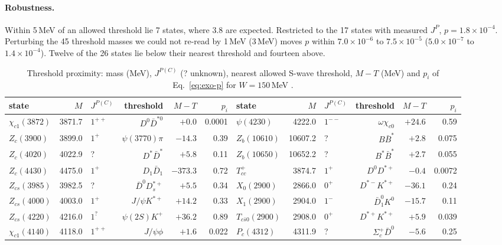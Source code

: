 \paragraph{Robustness.} Within 5\,MeV of an allowed threshold lie 7 states, where 3.8 are expected. Restricted to the 17 states with
measured $J^P$, $p=1.8\times10^{-4}$. Perturbing the 45 threshold masses we could not re-read by 1\,MeV (3\,MeV) moves $p$ within
$7.0\times10^{-6}$ to $7.5\times10^{-5}$ ($5.0\times10^{-7}$ to $1.4\times10^{-4}$). Twelve of the 26 states lie below their nearest
threshold and fourteen above.

\begin{table}[tbp]\centering\scriptsize\setlength{\tabcolsep}{2.6pt}
\caption{Threshold proximity: mass (MeV), $J^{P(C)}$ (? unknown), nearest allowed S-wave threshold, $M-T$ (MeV) and $p_i$ of
Eq.~\eqref{eq:exo-p} for $W=150$\,MeV .}
\label{tab:exo-b}
\begin{tabular}{@{}lrlrrr@{\hspace{8pt}}lrlrrr@{}}
\toprule
state & $M$ & $J^{P(C)}$ & threshold & $M-T$ & $p_i$ & state & $M$ & $J^{P(C)}$ & threshold & $M-T$ & $p_i$ \\
\midrule
$\chi_{c1}(3872)$ & 3871.7 & $1^{++}$ & $D^0\bar D^{*0}$ & $+0.0$ & 0.0001 & $\psi(4230)$ & 4222.0 & $1^{--}$ & $\omega\chi_{c0}$ & $+24.6$ & 0.59 \\
$Z_c(3900)$ & 3899.0 & $1^{+}$ & $\psi(3770)\pi$ & $-14.3$ & 0.39 & $Z_b(10610)$ & 10607.2 & ? & $B\bar B^*$ & $+2.8$ & 0.075 \\
$Z_c(4020)$ & 4022.9 & ? & $D^*\bar D^*$ & $+5.8$ & 0.11 & $Z_b(10650)$ & 10652.2 & ? & $B^*\bar B^*$ & $+2.7$ & 0.055 \\
$Z_c(4430)$ & 4475.0 & $1^{+}$ & $D_1\bar D_1$ & $-373.3$ & 0.72 & $T_{cc}^+$ & 3874.7 & $1^+$ & $D^0D^{*+}$ & $-0.4$ & 0.0072 \\
$Z_{cs}(3985)$ & 3982.5 & ? & $\bar D^0D_s^{*+}$ & $+5.5$ & 0.34 & $X_0(2900)$ & 2866.0 & $0^+$ & $D^{*-}K^{*+}$ & $-36.1$ & 0.24 \\
$Z_{cs}(4000)$ & 4003.0 & $1^{+}$ & $J/\psi K^{*+}$ & $+14.2$ & 0.33 & $X_1(2900)$ & 2904.0 & $1^-$ & $\bar D_1^0K^0$ & $-15.7$ & 0.11 \\
$Z_{cs}(4220)$ & 4216.0 & $1^{?}$ & $\psi(2S)K^+$ & $+36.2$ & 0.89 & $T_{c\bar s0}(2900)$ & 2908.0 & $0^+$ & $D^{*+}K^{*+}$ & $+5.9$ & 0.039 \\
$\chi_{c1}(4140)$ & 4118.0 & $1^{++}$ & $J/\psi\phi$ & $+1.6$ & 0.022 & $P_c(4312)$ & 4311.9 & ? & $\Sigma_c^+\bar D^0$ & $-5.6$ & 0.25 \\

\end{tabular}
\end{table}
